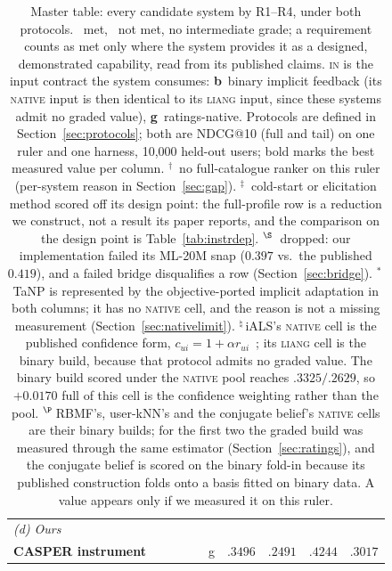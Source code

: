 \documentclass[acmsmall,review,anonymous]{acmart}
\newcommand{\cmark}{\ding{51}}
\newcommand{\xmark}{\ding{55}}
\begin{document}
\begin{table}[t]
\begin{tabular}{p{4.9cm}cccc c r@{\,/\,}l r@{\,/\,}l}
\midrule
\multicolumn{10}{l}{\emph{(d) Ours}}\\
\textbf{CASPER instrument} & \cmark & \cmark & \cmark & \cmark & g & $\mathbf{.3496}$ & $\mathbf{.2491}$ & $\mathbf{.4244}$ & $\mathbf{.3017}$ \\
\bottomrule
\end{tabular}
\caption{Master table: every candidate system by R1--R4, under both protocols. \cmark~met, \xmark~not met, no intermediate grade; a requirement counts as met only where the system provides it as a designed, demonstrated capability, read from its published claims. \textsc{in} is the input contract the system consumes: \textbf{b}~binary implicit feedback (its \textsc{native} input is then identical to its \textsc{liang} input, since these systems admit no graded value), \textbf{g}~ratings-native. Protocols are defined in Section~\ref{sec:protocols}; both are NDCG@10 (full and tail) on one ruler and one harness, 10,000 held-out users; bold marks the best measured value per column. $^{\dagger}$~no full-catalogue ranker on this ruler (per-system reason in Section~\ref{sec:gap}). $^{\ddagger}$~cold-start or elicitation method scored off its design point: the full-profile row is a reduction we construct, not a result its paper reports, and the comparison on the design point is Table~\ref{tab:instrdep}. $^{\S}$~dropped: our implementation failed its ML-20M snap ($0.397$ vs.\ the published $0.419$), and a failed bridge disqualifies a row (Section~\ref{sec:bridge}). $^{\ast}$\,TaNP is represented by the objective-ported implicit adaptation in both columns; it has no \textsc{native} cell, and the reason is not a missing measurement (Section~\ref{sec:nativelimit}). $^{\natural}$\,iALS's \textsc{native} cell is the published confidence form, $c_{ui}=1+\alpha r_{ui}$~\citep{hu2008collaborative}; its \textsc{liang} cell is the binary build, because that protocol admits no graded value. The binary build scored under the \textsc{native} pool reaches $.3325/.2629$, so $+0.0170$ full of this cell is the confidence weighting rather than the pool. $^{\P}$\,RBMF's, user-kNN's and the conjugate belief's \textsc{native} cells are their binary builds; for the first two the graded build was measured through the same estimator (Section~\ref{sec:ratings}), and the conjugate belief is scored on the binary fold-in because its published construction folds onto a basis fitted on binary data. A value appears only if we measured it on this ruler.}
\label{tab:master}
\end{table}
\end{document}
